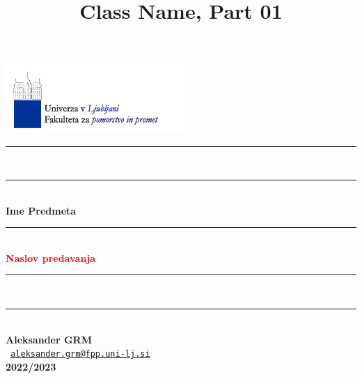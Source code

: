 \documentclass[8pt,aspectratio=169]{beamer} %
\title{Class Name, Part 01}
\author[A. GRM]{}
\begin{document}

\begin{frame}[plain,noframenumbering,label=titlepage]
	\begin{center}
		\includegraphics[width=7cm]{figs/logo/head.pdf}\\
		\vspace{5mm}%
		\hspace*{0mm}\rule{120mm}{1mm}\\
		\vspace*{-2mm}%
		\hspace*{0mm}\rule{120mm}{0.5mm}\\
		\vspace*{2.5mm}
		{\Huge \textbf{Ime Predmeta}}\\
		\vspace*{0.5mm}
		\hspace*{0mm}\rule{80mm}{0.5mm}\\
		\vspace{2mm}
		\large{\textbf{\textcolor{red}{Naslov predavanja}}}\\[2mm]
		\vspace*{-2mm}%
		\hspace*{0mm}\rule{120mm}{0.5mm}\\
		\vspace*{-1.5mm}%
		\hspace*{0mm}\rule{120mm}{1mm}\\
		\vspace*{5mm}
		\small{\textbf{Aleksander GRM}}\\[1mm]
		\footnotesize{\texttt{ \href{mailto:aleksander.grm@fpp.uni-lj.si}{aleksander.grm@fpp.uni-lj.si}}}\\[4mm]
		\small{\textbf{2022/2023}}
	\end{center}
\end{frame}

\end{document}
